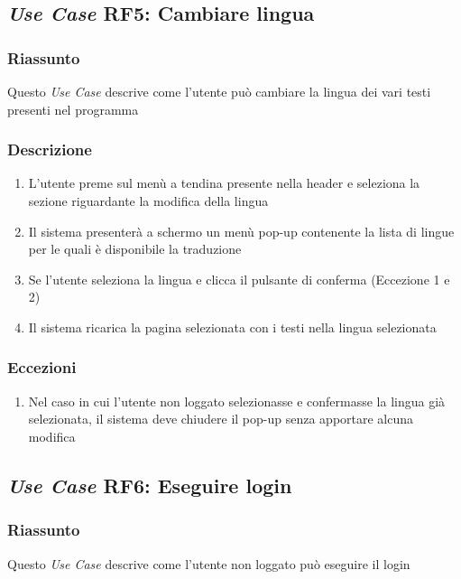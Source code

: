     \subsection{\textit{Use Case} RF5: Cambiare lingua}
        \subsubsection{Riassunto}
            Questo \textit{Use Case} descrive come l'utente può cambiare la lingua dei vari testi presenti nel programma
        \subsubsection{Descrizione}
            \begin{enumerate}
                \item L'utente preme sul menù a tendina presente nella header e seleziona la sezione riguardante la modifica della lingua
                \item Il sistema presenterà a schermo un menù pop-up contenente la lista di lingue per le quali è disponibile la traduzione
                \item Se l'utente seleziona la lingua e clicca il pulsante di conferma (Eccezione 1 e 2)
                \item Il sistema ricarica la pagina selezionata con i testi nella lingua selezionata
            \end{enumerate}
        \subsubsection{Eccezioni}
            \begin{enumerate}
                \item Nel caso in cui l'utente non loggato selezionasse e confermasse la lingua già selezionata, il sistema deve chiudere il pop-up senza apportare alcuna modifica
            \end{enumerate}

    \subsection{\textit{Use Case} RF6: Eseguire login}
        \subsubsection{Riassunto}
            Questo \textit{Use Case} descrive come l'utente non loggato può eseguire il login
